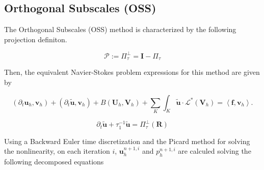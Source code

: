 \subsection*{Orthogonal Subscales (OSS)}
The Orthogonal Subscales (OSS) method is characterized by the following projection definiton.

\begin{equation}
\label{11}
\mathcal{P}:=\Pi_\tau^\bot=\mathbf{I}-\Pi_\tau
\end{equation}

Then, the equivalent Navier-Stokes problem expressions for this method are given by

\begin{equation}
\label{12}
(\partial_t\mathbf{u}_h,\mathbf{v}_h)+(\partial_t\tilde{\mathbf{u}},\mathbf{v}_h)+B(\mathbf{U}_h,\mathbf{V}_h)+\sum_K\int_K\tilde{\mathbf{u}}\cdot\mathcal{L}^*(\mathbf{V}_h)=\left<\mathbf{f},\mathbf{v}_h\right>.
\end{equation}

\begin{equation}
\label{13}
\partial_t\tilde{\mathbf{u}}+\tau_1^{-1}\tilde{\mathbf{u}}=\Pi_\tau^\bot(\mathbf{R})
\end{equation}

Using a Backward Euler time discretization and the Picard method for solving the nonlinearity, on each iteration $ i $, $ \mathbf{u}_h^{n+1,i} $ and $ p_h^{n+1,i} $ are calculed solving the following decomposed equations

